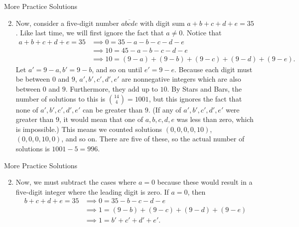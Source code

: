 \documentclass[9pt]{beamer}
\begin{document}
\begin{frame}[fragile, t]{More Practice Solutions}
    \begin{enumerate}
    \setcounter{enumi}{1}
        \item Now, consider a five-digit number $\overline{abcde}$ with digit sum $a+b+c+d+e=35$. Like last time, we will first ignore the fact that $a\neq 0$. Notice that
        \begin{align*}
            a+b+c+d+e=35 &\implies 0=35-a-b-c-d-e\\
            &\implies 10=45-a-b-c-d-e\\
            &\implies 10=(9-a)+(9-b)+(9-c)+(9-d)+(9-e).
        \end{align*}
        Let $a'=9-a,b'=9-b$, and so on until $e'=9-e$. Because each digit must be between $0$ and $9$, $a',b',c',d',e'$ are nonnegative integers which are also between $0$ and $9$. Furthermore, they add up to $10$. By Stars and Bars, the number of solutions to this is $\binom{14}{4}=1001$, but this ignores the fact that none of $a',b',c',d',e'$ can be greater than $9$. (If any of $a',b',c',d',e'$ were greater than $9$, it would mean that one of $a,b,c,d,e$ was less than zero, which is impossible.) This means we counted solutions $(0,0,0,0,10)$, $(0,0,0,10,0)$, and so on. There are five of these, so the actual number of solutions is $1001-5=996$.\\
        \bigskip
        
    \end{enumerate}
    
\end{frame}

        
        


\begin{frame}[fragile, t]{More Practice Solutions}
    \begin{enumerate}
    \setcounter{enumi}{1}        
        
        
        \item Now, we must subtract the cases where $a=0$ because these would result in a five-digit integer where the leading digit is zero. If $a=0$, then 
        \begin{align*}
            b+c+d+e=35 &\implies 0=35-b-c-d-e\\
            &\implies 1=(9-b)+(9-c)+(9-d)+(9-e)\\
            &\implies 1=b'+c'+d'+e'.
        \end{align*}
        
        
    \end{enumerate}
    
\end{frame}
\end{document}
